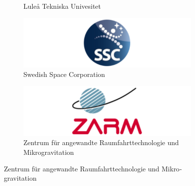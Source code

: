 \begin{figure}[htbp]
\begin{subfigure}{0.3\textwidth}
 		\caption*{Luleå Tekniska Univesitet}
 	\end{subfigure}	
	 \begin{subfigure}{0.3\textwidth}
 		\includegraphics[width=1\linewidth]{0-cover/img/ssc.png}
 		\caption*{Swedish Space Corporation}
 	\end{subfigure}	
	\begin{subfigure}{0.3\textwidth}
		\includegraphics[width=1\linewidth]{0-cover/img/zarm.png}
		\caption*{Zentrum für angewandte Raumfahrt­technologie und Mikro­gravitation}
	\end{subfigure}	
 		
\end{figure}
 
